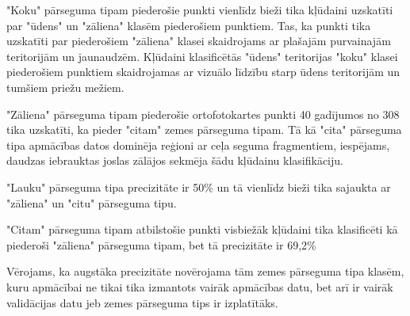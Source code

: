 \documentclass[12pt,paper=a4]{report}
\begin{document}
"Koku" pārseguma tipam piederošie punkti vienlīdz bieži tika kļūdaini uzskatīti par "ūdens" un "zāliena" klasēm piederošiem punktiem. Tas, ka punkti tika uzskatīti par piederošiem "zāliena" klasei skaidrojams ar plašajām purvainajām teritorijām un jaunaudzēm. Kļūdaini klasificētās "ūdens" teritorijas "koku" klasei piederošiem punktiem skaidrojamas ar vizuālo līdzību starp ūdens teritorijām un tumšiem priežu mežiem.\par
"Zāliena" pārseguma tipam piederošie ortofotokartes punkti 40 gadījumos no 308 tika uzskatīti, ka pieder "citam" zemes pārseguma tipam. Tā kā "cita" pārseguma tipa apmācības datos dominēja reģioni ar ceļa seguma fragmentiem, iespējams, daudzas iebrauktas joslas zālājos sekmēja šādu kļūdainu klasifikāciju.\par 
"Lauku" pārseguma tipa precizitāte ir 50\% un tā vienlīdz bieži tika sajaukta ar "zāliena" un "citu" pārseguma tipu. \par
"Citam" pārseguma tipam atbilstošie punkti visbiežāk kļūdaini tika klasificēti kā piederoši "zāliena" pārseguma tipam, bet tā precizitāte ir 69,2\%\par
Vērojams, ka augstāka precizitāte novērojama tām zemes pārseguma tipa klasēm, kuru apmācībai ne tikai tika izmantots vairāk apmācības datu, bet arī ir vairāk validācijas datu jeb zemes pārseguma tips ir izplatītāks.
\end{document}
